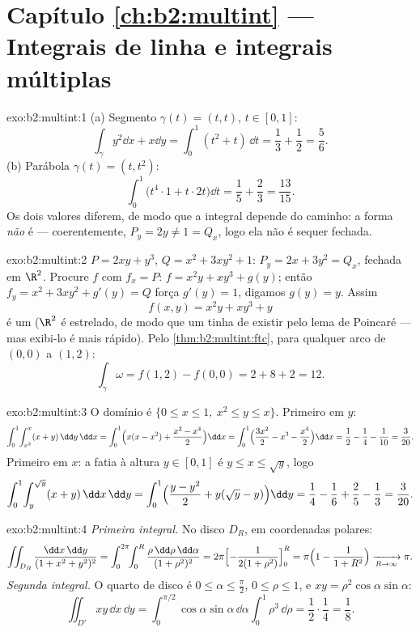 \section*{Capítulo \ref{ch:b2:multint} --- Integrais de linha e integrais múltiplas}

\begin{solution}{exo:b2:multint:1}
(a) Segmento $\gamma(t) = (t, t)$, $t \in [0,1]$:
\[
\int_\gamma y^2\dd x + x\dd y
= \int_0^1 (t^2 + t)\,\dd t = \frac13 + \frac12 = \frac56 .
\]
(b) Parábola $\gamma(t) = (t, t^2)$:
\[
\int_0^1 \bigl(t^4\cdot 1 + t\cdot 2t\bigr)\dd t
= \frac15 + \frac23 = \frac{13}{15} .
\]
Os dois valores diferem, de modo que a integral depende do caminho: a forma
\emph{não} é  --- coerentemente, $P_y = 2y \neq 1 = Q_x$, logo
ela não é sequer fechada.
\end{solution}

\begin{solution}{exo:b2:multint:2}
$P = 2xy + y^3$, $Q = x^2 + 3xy^2 + 1$: $P_y = 2x + 3y^2 = Q_x$,
fechada em $\R^2$. Procure $f$ com $f_x = P$: $f = x^2y + xy^3
+ g(y)$; então $f_y = x^2 + 3xy^2 + g'(y) = Q$ força $g'(y) = 1$,
digamos $g(y) = y$. Assim
\[
f(x, y) = x^2y + xy^3 + y
\]
é um  ($\R^2$ é estrelado, de modo que um  tinha de
existir pelo lema de Poincaré --- mas exibi-lo é mais rápido). Pelo
\cref{thm:b2:multint:ftc}, para qualquer arco de $(0,0)$ a $(1,2)$:
\[
\int_\gamma\omega = f(1, 2) - f(0, 0) = 2 + 8 + 2 = 12 .
\]
\end{solution}

\begin{solution}{exo:b2:multint:3}
O domínio é $\{0 \leq x \leq 1,\ x^2 \leq y \leq x\}$.
Primeiro em $y$:
\[
\int_0^1\!\int_{x^2}^{x}(x + y)\,\dd y\,\dd x
= \int_0^1\Bigl(x(x - x^2)
+ \frac{x^2 - x^4}{2}\Bigr)\dd x
= \int_0^1\Bigl(\frac{3x^2}{2} - x^3 - \frac{x^4}{2}\Bigr)\dd x
= \frac12 - \frac14 - \frac1{10} = \frac{3}{20} .
\]
Primeiro em $x$: a fatia à altura $y \in [0, 1]$ é $y \leq x \leq
\sqrt y$, logo
\[
\int_0^1\!\int_{y}^{\sqrt y}(x + y)\,\dd x\,\dd y
= \int_0^1\Bigl(\frac{y - y^2}{2}
+ y(\sqrt y - y)\Bigr)\dd y
= \frac14 - \frac16 + \frac25 - \frac13 = \frac{3}{20} .
\]
\end{solution}

\begin{solution}{exo:b2:multint:4}
\emph{Primeira integral.} No disco $D_R$, em coordenadas polares:
\[
\iint_{D_R}\frac{\dd x\,\dd y}{(1 + x^2 + y^2)^2}
= \int_0^{2\pi}\!\!\int_0^R
\frac{\rho\,\dd\rho\,\dd\alpha}{(1 + \rho^2)^2}
= 2\pi\Bigl[-\frac{1}{2(1 + \rho^2)}\Bigr]_0^R
= \pi\Bigl(1 - \frac{1}{1 + R^2}\Bigr)
\xrightarrow[R \to \infty]{} \pi .
\]
\emph{Segunda integral.} O quarto de disco é $0 \leq \alpha \leq
\frac\pi2$, $0 \leq \rho \leq 1$, e $xy =
\rho^2\cos\alpha\sin\alpha$:
\[
\iint_{D'}xy\,\dd x\,\dd y
= \int_0^{\pi/2}\!\!\cos\alpha\sin\alpha\,\dd\alpha
\int_0^1 \rho^3\,\dd\rho
= \frac12\cdot\frac14 = \frac18 .
\]
\end{solution}

